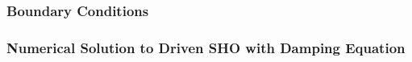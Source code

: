 \subsubsection{Boundary Conditions} %

\subsubsection{Numerical Solution to Driven SHO with Damping Equation}


